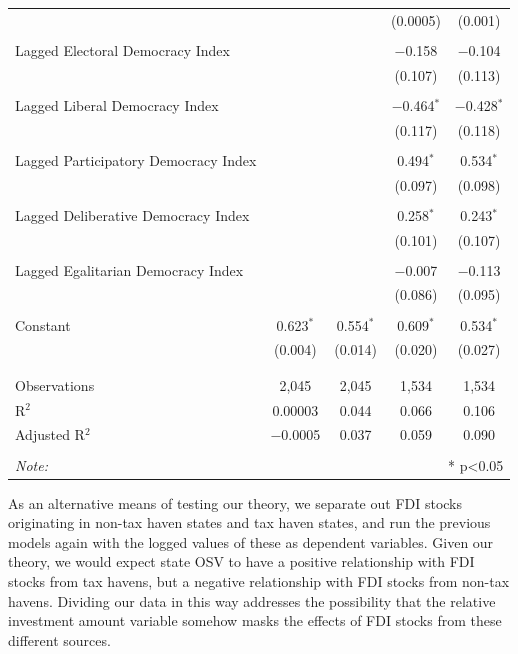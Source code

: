 \documentclass[11pt, titlepage]{article} %
\begin{document}
\begin{table}[!htbp]
\begin{tabular}{@{\extracolsep{5pt}}lcccc}
  &  &  & (0.0005) & (0.001) \\ 
  & & & & \\ 
 Lagged Electoral Democracy Index &  &  & $-$0.158 & $-$0.104 \\ 
  &  &  & (0.107) & (0.113) \\ 
  & & & & \\ 
 Lagged Liberal Democracy Index &  &  & $-$0.464$^{*}$ & $-$0.428$^{*}$ \\ 
  &  &  & (0.117) & (0.118) \\ 
  & & & & \\ 
 Lagged Participatory Democracy Index &  &  & 0.494$^{*}$ & 0.534$^{*}$ \\ 
  &  &  & (0.097) & (0.098) \\ 
  & & & & \\ 
 Lagged Deliberative Democracy Index &  &  & 0.258$^{*}$ & 0.243$^{*}$ \\ 
  &  &  & (0.101) & (0.107) \\ 
  & & & & \\ 
 Lagged Egalitarian Democracy Index &  &  & $-$0.007 & $-$0.113 \\ 
  &  &  & (0.086) & (0.095) \\ 
  & & & & \\ 
 Constant & 0.623$^{*}$ & 0.554$^{*}$ & 0.609$^{*}$ & 0.534$^{*}$ \\ 
  & (0.004) & (0.014) & (0.020) & (0.027) \\ 
  & & & & \\ 
\hline \\[-1.8ex] 
Observations & 2,045 & 2,045 & 1,534 & 1,534 \\ 
R$^{2}$ & 0.00003 & 0.044 & 0.066 & 0.106 \\ 
Adjusted R$^{2}$ & $-$0.0005 & 0.037 & 0.059 & 0.090 \\ 
\hline 
\hline \\[-1.8ex] 
\textit{Note:}  & \multicolumn{4}{r}{* p<0.05} \\ 
\end{tabular} 
\end{table} 

As an alternative means of testing our theory, we separate out FDI stocks originating in non-tax haven states and tax haven states, and run the previous models again with the logged values of these as dependent variables. Given our theory, we would expect state OSV to have a positive relationship with FDI stocks from tax havens, but a negative relationship with FDI stocks from non-tax havens. Dividing our data in this way addresses the possibility that the relative investment amount variable somehow masks the effects of FDI stocks from these different sources.
\end{document}
